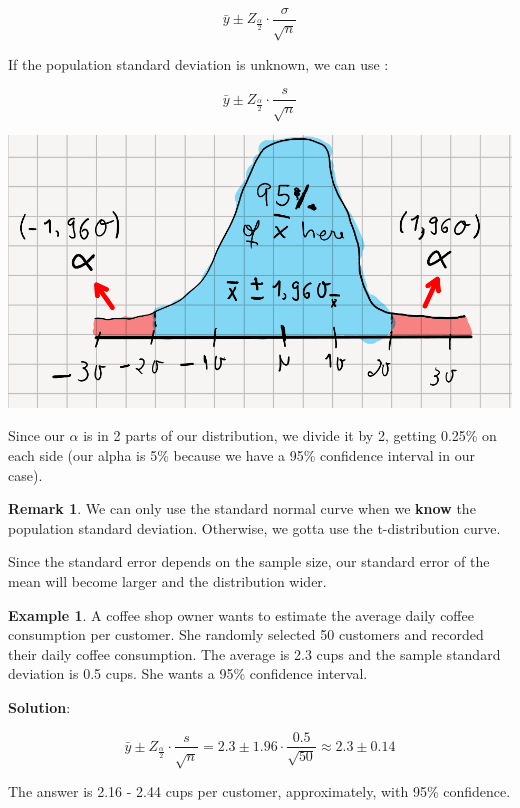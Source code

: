 \documentclass[12pt]{book}
\theoremstyle{definition}
\newtheorem{exmp}{Example}[section]
\newtheorem{remark}{Remark}[section]
\begin{document}
\begin{equation}
    \bar{y} \pm Z_{\frac{\alpha}{2}} \cdot \frac{\sigma}{\sqrt{n}}
\end{equation}

If the population standard deviation is unknown, we can use :

\begin{equation}
    \bar{y} \pm Z_{\frac{\alpha}{2}} \cdot \frac{s}{\sqrt{n}}
\end{equation}

\begin{center}
    \includegraphics[scale=0.4]{../assets/confidence.png}
\end{center}

Since our $\alpha$ is in 2 parts of our distribution, we divide it by 2, getting 0.25\% on each side (our alpha is 5\% because we have a 95\% confidence interval in our case).

\begin{remark}
    We can only use the standard normal curve when we \textbf{know} the population standard deviation. Otherwise, we gotta use the t-distribution curve.
\end{remark}

Since the standard error depends on the sample size, our standard error of the mean will become larger and the distribution wider.

\begin{exmp}
    A coffee shop owner wants to estimate the average daily coffee consumption per customer. She randomly selected 50 customers and recorded their daily coffee consumption. The average is 2.3 cups and the sample standard deviation is 0.5 cups. She wants a 95\% confidence interval.

    \textbf{Solution}:

     \begin{equation}
       \bar{y} \pm Z_{\frac{\alpha}{2}} \cdot \frac{s}{\sqrt{n}} = 2.3 \pm 1.96 \cdot \frac{0.5}{\sqrt{50}} \approx 2.3 \pm 0.14
     \end{equation}

     The answer is 2.16 - 2.44 cups per customer, approximately, with 95\% confidence.
\end{exmp}
\end{document}
